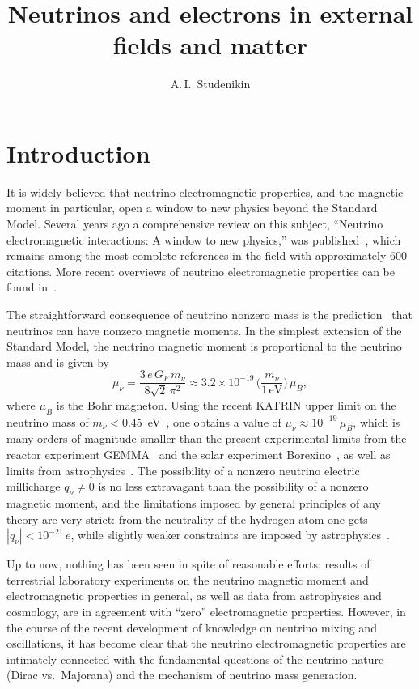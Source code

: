\documentclass[a4paper,11pt]{article}
\title{Neutrinos and electrons in external fields and matter}
\author*[a,b]{A.\,I.~Studenikin}
\affiliation[a]{Department of Theoretical Physics, Lomonosov Moscow State University,\\
119991 Moscow, Russia}
\begin{document}
\maketitle


\section{Introduction}
\label{sec:intro}

It is widely believed that neutrino electromagnetic properties, and the magnetic moment in particular, open a window to new physics beyond the Standard Model. Several years ago a comprehensive review on this subject, ``Neutrino electromagnetic interactions: A window to new physics,'' was published~\cite{Giunti:2015RMP}, which remains among the most complete references in the field with approximately 600 citations. More recent overviews of neutrino electromagnetic properties can be found in~\cite{Studenikin:2022PoS,Studenikin:2024PPN}.

The straightforward consequence of neutrino nonzero mass is the prediction~\cite{Fujikawa:Shrock:1980} that neutrinos can have nonzero magnetic moments. In the simplest extension of the Standard Model, the neutrino magnetic moment is proportional to the neutrino mass and is given by
\begin{equation}
\label{eq:mu_SM}
\mu_\nu = \frac{3\, e\, G_F\, m_\nu}{8\sqrt{2}\,\pi^2} \approx 3.2 \times 10^{-19}\,\Big(\frac{m_\nu}{1\,\text{eV}}\Big)\,\mu_B,
\end{equation}
where $\mu_B$ is the Bohr magneton. Using the recent KATRIN upper limit on the neutrino mass of $m_\nu < 0.45$~eV~\cite{KATRIN:2024}, one obtains a value of $\mu_\nu \approx 10^{-19}\,\mu_B$, which is many orders of magnitude smaller than the present experimental limits from the reactor experiment GEMMA~\cite{GEMMA:2012} and the solar experiment Borexino~\cite{Borexino:2017}, as well as limits from astrophysics~\cite{Raffelt:1990}. The possibility of a nonzero neutrino electric millicharge $q_\nu \neq 0$ is no less extravagant than the possibility of a nonzero magnetic moment, and the limitations imposed by general principles of any theory are very strict: from the neutrality of the hydrogen atom one gets $|q_\nu| < 10^{-21}\,e$, while slightly weaker constraints are imposed by astrophysics~\cite{Studenikin:Tokarev:2014NPB}.

Up to now, nothing has been seen in spite of reasonable efforts: results of terrestrial laboratory experiments on the neutrino magnetic moment and electromagnetic properties in general, as well as data from astrophysics and cosmology, are in agreement with ``zero'' electromagnetic properties. However, in the course of the recent development of knowledge on neutrino mixing and oscillations, it has become clear that the neutrino electromagnetic properties are intimately connected with the fundamental questions of the neutrino nature (Dirac vs.\ Majorana) and the mechanism of neutrino mass generation.
\end{document}
